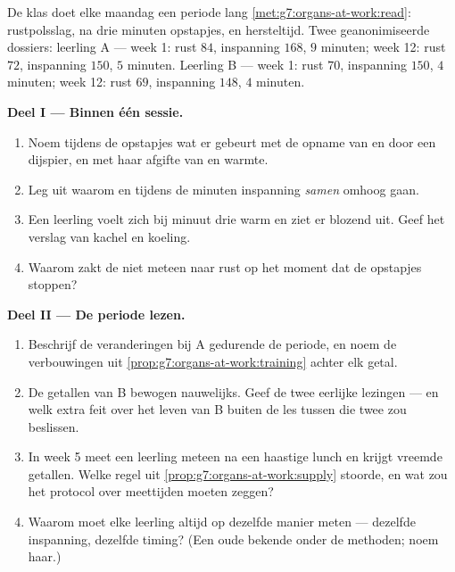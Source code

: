 \begin{problem}\label{pb:g7:organs-at-work:1}
De klas doet elke maandag een periode lang
\cref{met:g7:organs-at-work:read}: rustpolsslag,  na drie minuten
opstapjes, en hersteltijd. Twee geanonimiseerde dossiers: leerling A ---
week 1: rust $84$, inspanning $168$,  $9$ minuten; week 12: rust
$72$, inspanning $150$,  $5$ minuten. Leerling B --- week 1: rust
$70$, inspanning $150$,  $4$ minuten; week 12: rust $69$,
inspanning $148$,  $4$ minuten.

\medskip\noindent\textbf{Deel I --- Binnen één sessie.}
\begin{enumerate}
  \item Noem tijdens de opstapjes wat er gebeurt met de opname van
         en  door een dijspier, en met haar afgifte van
         en warmte.
  \item Leg uit waarom  en  tijdens de minuten
        inspanning \emph{samen} omhoog gaan.
  \item Een leerling voelt zich bij minuut drie warm en ziet er blozend
        uit. Geef het verslag van kachel en koeling.
  \item Waarom zakt de  niet meteen naar rust op het moment dat
        de opstapjes stoppen?
\end{enumerate}

\medskip\noindent\textbf{Deel II --- De periode lezen.}
\begin{enumerate}[resume]
  \item Beschrijf de veranderingen bij A gedurende de periode, en noem de
        verbouwingen uit
        \cref{prop:g7:organs-at-work:training} achter elk getal.
  \item De getallen van B bewogen nauwelijks. Geef de twee eerlijke
        lezingen --- en welk extra feit over het leven van B buiten de les
        tussen die twee zou beslissen.
  \item In week 5 meet een leerling meteen na een haastige lunch en krijgt
        vreemde getallen. Welke regel uit
        \cref{prop:g7:organs-at-work:supply} stoorde, en wat zou het
        protocol over meettijden moeten zeggen?
  \item Waarom moet elke leerling altijd op dezelfde manier meten ---
        dezelfde inspanning, dezelfde timing? (Een oude bekende onder de
        methoden; noem haar.)
\end{enumerate}


\end{problem}
